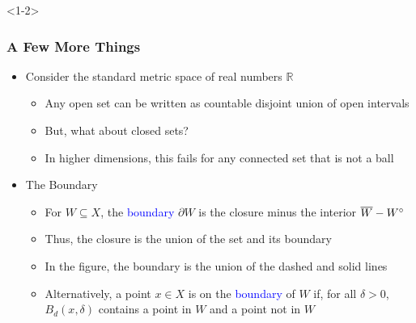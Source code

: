 \documentclass[10pt,english,aspectratio=169]{beamer}
\begin{document}
\begin{frame}<1-2> \frametitle{A Few More Things}

\begin{itemize}
  \setlength{\itemsep}{4mm}
  \item Consider the standard metric space of real numbers $\mathbb{R}$ \vspace{1mm}
  \begin{itemize}
    \setlength{\itemsep}{2mm}
    \item<1-> Any open set can be written as countable disjoint union of open intervals
    \item But, what about closed sets?
    \item In higher dimensions, this fails for any connected set that is not a ball
  \end{itemize}
  
  \item<2-> The Boundary \vspace{1mm}
  \begin{itemize}
    \setlength{\itemsep}{2mm}
    \item For $W \subseteq X$, the \textcolor{blue}{boundary} $\partial W$ is the closure minus the interior $\overline{W} - {W}^{\circ}\!\!\!$
    \item Thus, the closure is the union of the set and its boundary
    \item In the figure, the boundary is the union of the dashed and solid lines
    \item Alternatively, a point $x\in X$ is on the \textcolor{blue}{boundary} of $W$ if, for all $\delta>0$, $B_d (x,\delta)$ contains a point in $W$ and a point not in $W$

  \end{itemize}
\end{itemize}

\end{frame}
\end{document}
